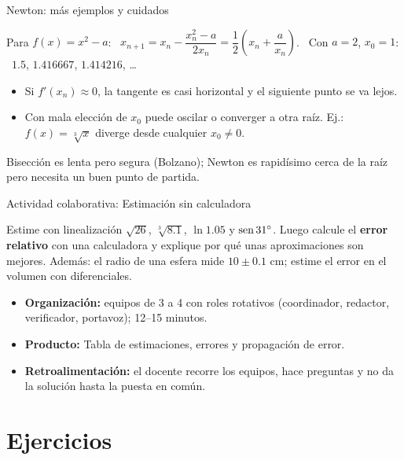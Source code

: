 \documentclass[10pt,aspectratio=169]{beamer}
\begin{document}
\begin{frame}{Newton: más ejemplos y cuidados}
  \begin{ejemplo}
    Para $f(x)=x^2-a$: \ $x_{n+1}=x_n-\dfrac{x_n^2-a}{2x_n}=\dfrac12\left(x_n+\dfrac a{x_n}\right)$.
    \ Con $a=2$, $x_0=1$: \ $1.5$, $1.416667$, $1.414216$, \dots
  \end{ejemplo}
  \begin{observacion}
    \begin{itemize}
      \item Si $f'(x_n)\approx0$, la tangente es casi horizontal y el siguiente punto se va lejos.
      \item Con mala elección de $x_0$ puede oscilar o converger a otra raíz. Ej.: $f(x)=\sqrt[3]x$ diverge desde cualquier $x_0\ne0$.
    \end{itemize}
  \end{observacion}
  \begin{idea}
    Bisección es lenta pero segura (Bolzano); Newton es rapidísimo cerca de la raíz pero necesita un buen punto de partida.
  \end{idea}
\end{frame}

\begin{frame}{Actividad colaborativa: Estimación sin calculadora}
  \small
  \begin{activa}
    Estime con linealización $\sqrt{26}$, $\sqrt[3]{8.1}$, $\ln 1.05$ y $\operatorname{sen} 31^\circ$. Luego calcule el \textbf{error relativo} con una calculadora y explique por qué unas aproximaciones son mejores. Además: el radio de una esfera mide $10\pm0.1$ cm; estime el error en el volumen con diferenciales.
  \end{activa}
  \begin{itemize}
    \item \textbf{Organización:} equipos de 3 a 4 con roles rotativos (coordinador, redactor, verificador, portavoz); 12--15 minutos.
    \item \textbf{Producto:} Tabla de estimaciones, errores y propagación de error.
    \item \textbf{Retroalimentación:} el docente recorre los equipos, hace preguntas y no da la solución hasta la puesta en común.
  \end{itemize}
\end{frame}

\section{Ejercicios}
\end{document}
